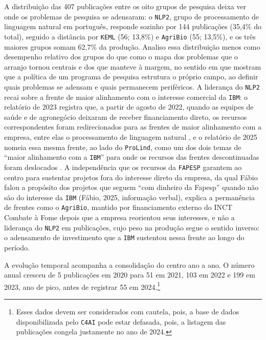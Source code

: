 A distribuição das 407 publicações entre os oito grupos de pesquisa deixa ver onde os problemas de pesquisa se adensaram: o \texttt{NLP2}, grupo de processamento de linguagem natural em português, responde sozinho por 144 publicações (35,4\% do total), seguido a distância por \texttt{KEML} (56; 13,8\%) e \texttt{AgriBio} (55; 13,5\%), e os três maiores grupos somam 62,7\% da produção. Analiso essa distribuição menos como desempenho relativo dos grupos do que como o mapa dos problemas que o arranjo tornou centrais e dos que manteve à margem, no sentido em que \textcite{TurnerCallon1986State} mostram que a política de um programa de pesquisa estrutura o próprio campo, ao definir quais problemas se adensam e quais permanecem periféricos. A liderança do \texttt{NLP2} recai sobre a frente de maior alinhamento com o interesse comercial da \texttt{IBM}: o relatório de 2023 registra que, a partir de agosto de 2022, quando as equipes de saúde e de agronegócio deixaram de receber financiamento direto, os recursos correspondentes foram redirecionados para as frentes de maior alinhamento com a empresa, entre elas o processamento de linguagem natural \parencite{C4AI2023}, e o relatório de 2025 nomeia essa mesma frente, ao lado do \texttt{ProLind}, como um dos dois temas de \enquote{maior alinhamento com a \texttt{IBM}} para onde os recursos das frentes descontinuadas foram deslocados \parencite{C4AI2025}. A independência que os recursos da \texttt{FAPESP} garantem ao centro para sustentar projetos fora do interesse direto da empresa, da qual Fábio falou a propósito dos projetos que seguem \enquote{com dinheiro da Fapesp} quando não são do interesse da \texttt{IBM} (Fábio, 2025, informação verbal), explica a permanência de frentes como o \texttt{AgriBio}, mantido por financiamento externo do INCT Combate à Fome depois que a empresa reorientou seus interesses, e não a liderança do \texttt{NLP2} em publicações, cujo peso na produção segue o sentido inverso: o adensamento de investimento que a \texttt{IBM} sustentou nessa frente ao longo do período. 

A evolução temporal acompanha a consolidação do centro ano a ano. O número anual cresceu de 5 publicações em 2020 para 51 em 2021, 103 em 2022 e 199 em 2023, ano de pico, antes de registrar 55 em 2024.\footnote{Esses dados devem ser considerados com cautela, pois, a base de dados disponibilizada pelo \texttt{C4AI} pode estar defasada, pois, a listagem das publicações congela justamente no ano de 2024.}

